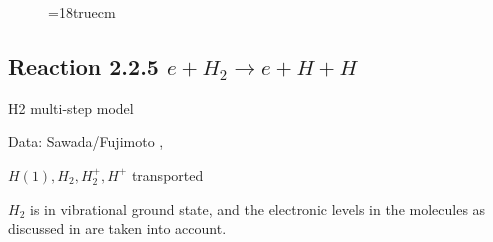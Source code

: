 \begin{figure} \label{2.1.8b}
\epsfxsize=18truecm
\end{figure}
\newpage


\subsection{
Reaction 2.2.5    $e + H_2   \rightarrow e + H + H  $
}

H2 multi-step model

 Data: Sawada/Fujimoto ,\cite{kn:Sawada}

$  H(1), H_2, H_2^+, H^+ $ transported


$H_2$ is in vibrational ground state, and the electronic levels
in the molecules as discussed in \cite{kn:Sawada} are taken into
account.


